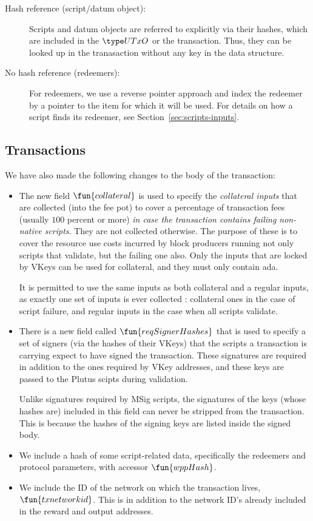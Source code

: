 \begin{description}
\item
  [Hash reference (script/datum object):]
  Scripts and datum objects are referred to explicitly via their hashes,
  which are included in the $\UTxO$ or the transaction. Thus, they can be
  looked up in the tranasaction without any key in the data structure.

  \item[No hash reference (redeemers):] For redeemers,
  we use a reverse pointer approach and
  index the redeemer by a pointer to the item for which it will be used.
  For details on how a script finds its redeemer, see Section~\ref{sec:scripts-inputs}.
\end{description}

\subsection{Transactions}
\label{sec:transctions}
We have also made the following changes to
the body of the transaction:

\begin{itemize}
  \item The new field $\fun{collateral}$ is used to specify the \emph{collateral inputs}
    that are collected (into the fee pot) to cover a percentage of
    transaction fees (usually $100$ percent or more)
    \emph{in case the transaction contains failing non-native scripts}. They are not collected otherwise.
    The purpose of these is to cover the resource use costs incurred by block producers running not only
    scripts that validate, but the failing one also. Only the inputs that are locked by VKeys can
    be used for collateral, and they must only contain ada.

    It is permitted to use the same inputs as both collateral and a regular inputs, as exactly
    one set of inputs is ever collected : collateral ones in the case of script failure, and regular inputs
    in the case when all scripts validate.

  \item There is a new field called $\fun{reqSignerHashes}$ that is used to specify a set of signers (via the
    hashes of their VKeys) that the scripts a transaction is carrying expect to have signed the transaction.
    These signatures are required in addition to the ones required by VKey addresses, and
    these keys are passed to the Plutus scipts during validation.

    Unlike signatures required by MSig scripts, the signatures of the keys
    (whose hashes are) included
    in this field can never be stripped from the transaction. This is because
    the hashes of the signing keys are listed inside the signed body.
  \item We include a hash of some script-related data, specifically the redeemers and protocol parameters,
    with accessor $\fun{wppHash}$.

  \item We include the ID of the network on which the transaction lives, $\fun{txnetworkid}$.
  This is in addition to the network ID's already included in the reward and output addresses.
\end{itemize}

